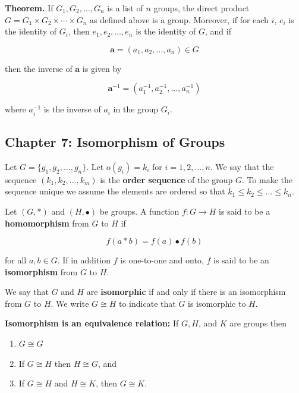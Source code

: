 \documentclass{article}
\begin{document}
\textbf{Theorem.} If \(G_1, G_2, \ldots, G_n\) is a list of \(n\) groups, the direct product \(G = G_1 \times G_2 \times \cdots \times G_n\) as defined above is a group. Moreover, if for each \(i\), \(e_i\) is the identity of \(G_i\), then \(e_1, e_2, \ldots, e_n\) is the identity of \(G\), and if 

\[
\boldsymbol{a} = (a_1, a_2, \ldots, a_n) \in G
\]

then the inverse of \(\boldsymbol{a}\) is given by

\[
\boldsymbol{a}^{-1} = (a_1^{-1}, a_2^{-1}, \ldots, a_n^{-1})
\]

where \(a_i^{-1}\) is the inverse of \(a_i\) in the group \(G_i\).

\pagebreak
\subsection{Chapter 7: Isomorphism of Groups}

Let \(G = \{g_1, g_2, \ldots, g_n \}\). Let \(\text{o}(g_i) = k_i\) for \(i = 1, 2 , \ldots, n\). We say that the sequence \((k_1, k_2, \ldots, k_m) \) is the \textbf{order sequence} of the group \(G\). To make the sequence unique we assume the elements are ordered so that \(k_1 \leq k_2 \leq \ldots \leq k_n\).

Let \((G, *)\) and \((H, \bullet)\)  be groups. A function \(f : G \to H\) is said to be a \textbf{homomorphism} from \(G\) to \(H\) if

\[
f(a * b) = f(a) \bullet f(b)
\]

for all \(a, b \in G\). If in addition \(f\) is one-to-one and onto, \(f\) is said to be an \textbf{isomorphism} from \(G\) to \(H\).

We say that \(G\) and \(H\) are \textbf{isomorphic} if and only if there is an isomorphism from \(G\) to \(H\). We write \(G \cong H\) to indicate that \(G\) is isomorphic to \(H\).

\textbf{Isomorphism is an equivalence relation:} If \(G, H\), and \(K\) are groups then

\begin{enumerate}[1.]

\item \(G \cong G\)

\item If \(G \cong H\) then \(H \cong G\), and

\item If \(G \cong H\) and \(H \cong K\), then \(G \cong K\).

\end{enumerate}
\end{document}
